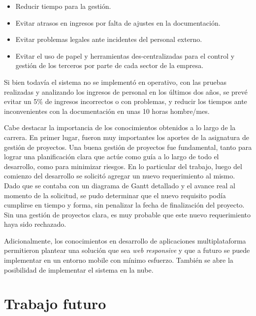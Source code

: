 \begin{itemize}
\item Reducir tiempo para la gestión.
\item Evitar atrasos en ingresos por falta de ajustes en la documentación.
\item Evitar problemas legales ante incidentes del personal externo.
\item Evitar el uso de papel y herramientas des-centralizadas para el control y gestión de los terceros por parte de cada sector de la empresa. 
\end{itemize}

Si bien todavía el sistema no se implementó en operativo, con las pruebas realizadas y analizando los ingresos de personal en los últimos dos años, se prevé evitar un 5\% de ingresos incorrectos o con problemas, y reducir los tiempos ante inconvenientes con la documentación en unas 10 horas hombre/mes.

Cabe destacar la importancia de los conocimientos obtenidos a lo largo de la carrera. En primer lugar, fueron muy importantes los aportes de la asignatura de gestión de proyectos. Una buena gestión de proyectos fue fundamental, tanto para lograr una planificación clara que actúe como guía a lo largo de todo el desarrollo, como para minimizar riesgos. En lo particular del trabajo, luego del comienzo del desarrollo se solicitó agregar un nuevo requerimiento al mismo. Dado que se contaba con un diagrama de Gantt \citep{WEBSITE:DiagGantt} detallado y el avance real al momento de la solicitud, se pudo determinar que el nuevo requisito podía cumplirse en tiempo y forma, sin penalizar la fecha de finalización del proyecto. Sin una gestión de proyectos clara, es muy probable que este nuevo requerimiento haya sido rechazado.

Adicionalmente, los conocimientos en desarrollo de aplicaciones multiplataforma permitieron plantear una solución que sea \textit{web responsive} y que a futuro se puede implementar en un entorno mobile con mínimo esfuerzo. También se abre la posibilidad de implementar el sistema en la nube.


\section{Trabajo futuro}

